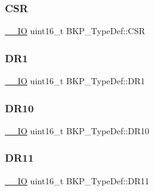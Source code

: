 \mbox{\label{struct_b_k_p___type_def_a8edc0ddaac3db876f8d3ddee902bc610}} 
\subsubsection{\texorpdfstring{CSR}{CSR}}
{\footnotesize\ttfamily \mbox{\hyperlink{group___c_m_s_i_s___c_m3__core__definitions_gaec43007d9998a0a0e01faede4133d6be}{\+\_\+\+\_\+\+IO}} uint16\+\_\+t B\+K\+P\+\_\+\+Type\+Def\+::\+C\+SR}

\mbox{\label{struct_b_k_p___type_def_aaa1a907c0aaf85c6de3aa3d829a07a3a}} 
\subsubsection{\texorpdfstring{DR1}{DR1}}
{\footnotesize\ttfamily \mbox{\hyperlink{group___c_m_s_i_s___c_m3__core__definitions_gaec43007d9998a0a0e01faede4133d6be}{\+\_\+\+\_\+\+IO}} uint16\+\_\+t B\+K\+P\+\_\+\+Type\+Def\+::\+D\+R1}

\mbox{\label{struct_b_k_p___type_def_a36060bb3e662e5c2370892caf1a19da6}} 
\subsubsection{\texorpdfstring{DR10}{DR10}}
{\footnotesize\ttfamily \mbox{\hyperlink{group___c_m_s_i_s___c_m3__core__definitions_gaec43007d9998a0a0e01faede4133d6be}{\+\_\+\+\_\+\+IO}} uint16\+\_\+t B\+K\+P\+\_\+\+Type\+Def\+::\+D\+R10}

\mbox{\label{struct_b_k_p___type_def_af0938123a38313da403033b8f8d7bc5c}} 
\subsubsection{\texorpdfstring{DR11}{DR11}}
{\footnotesize\ttfamily \mbox{\hyperlink{group___c_m_s_i_s___c_m3__core__definitions_gaec43007d9998a0a0e01faede4133d6be}{\+\_\+\+\_\+\+IO}} uint16\+\_\+t B\+K\+P\+\_\+\+Type\+Def\+::\+D\+R11}

